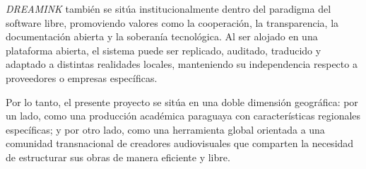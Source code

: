 \documentclass[12pt]{article}
\begin{document}
	\textit{DREAMINK} también se sitúa institucionalmente dentro del paradigma del software libre, promoviendo valores como la cooperación, la transparencia, la documentación abierta y la soberanía tecnológica. Al ser alojado en una plataforma abierta, el sistema puede ser replicado, auditado, traducido y adaptado a distintas realidades locales, manteniendo su independencia respecto a proveedores o empresas específicas.

	Por lo tanto, el presente proyecto se sitúa en una doble dimensión geográfica: por un lado, como una producción académica paraguaya con características regionales específicas; y por otro lado, como una herramienta global orientada a una comunidad transnacional de creadores audiovisuales que comparten la necesidad de estructurar sus obras de manera eficiente y libre.

	\printbibliography
\end{document}
